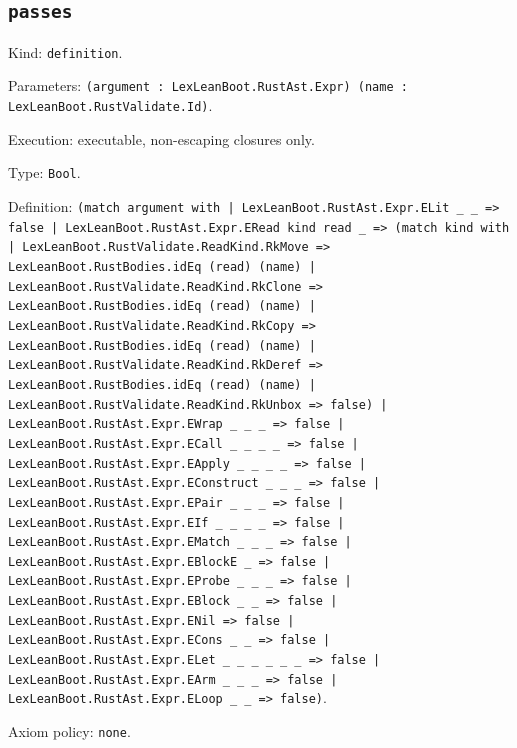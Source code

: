 \documentclass[11pt]{article}
\begin{document}
\subsection*{\texttt{passes}}
\noindent Kind: \texttt{definition}.\par
\noindent Parameters: \texttt{(argument : LexLeanBoot.RustAst.Expr) (name : LexLeanBoot.RustValidate.Id)}.\par
\noindent Execution: executable, non-escaping closures only.\par
\noindent Type: \texttt{Bool}.\par
\noindent Definition: \texttt{(match argument with | LexLeanBoot.RustAst.Expr.ELit \_ \_ => false | LexLeanBoot.RustAst.Expr.ERead kind read \_ => (match kind with | LexLeanBoot.RustValidate.ReadKind.RkMove => LexLeanBoot.RustBodies.idEq (read) (name) | LexLeanBoot.RustValidate.ReadKind.RkClone => LexLeanBoot.RustBodies.idEq (read) (name) | LexLeanBoot.RustValidate.ReadKind.RkCopy => LexLeanBoot.RustBodies.idEq (read) (name) | LexLeanBoot.RustValidate.ReadKind.RkDeref => LexLeanBoot.RustBodies.idEq (read) (name) | LexLeanBoot.RustValidate.ReadKind.RkUnbox => false) | LexLeanBoot.RustAst.Expr.EWrap \_ \_ \_ => false | LexLeanBoot.RustAst.Expr.ECall \_ \_ \_ \_ => false | LexLeanBoot.RustAst.Expr.EApply \_ \_ \_ \_ => false | LexLeanBoot.RustAst.Expr.EConstruct \_ \_ \_ => false | LexLeanBoot.RustAst.Expr.EPair \_ \_ \_ => false | LexLeanBoot.RustAst.Expr.EIf \_ \_ \_ \_ => false | LexLeanBoot.RustAst.Expr.EMatch \_ \_ \_ => false | LexLeanBoot.RustAst.Expr.EBlockE \_ => false | LexLeanBoot.RustAst.Expr.EProbe \_ \_ \_ => false | LexLeanBoot.RustAst.Expr.EBlock \_ \_ => false | LexLeanBoot.RustAst.Expr.ENil => false | LexLeanBoot.RustAst.Expr.ECons \_ \_ => false | LexLeanBoot.RustAst.Expr.ELet \_ \_ \_ \_ \_ \_ => false | LexLeanBoot.RustAst.Expr.EArm \_ \_ \_ => false | LexLeanBoot.RustAst.Expr.ELoop \_ \_ => false)}.\par
\noindent Axiom policy: \texttt{none}.\par
\end{document}
